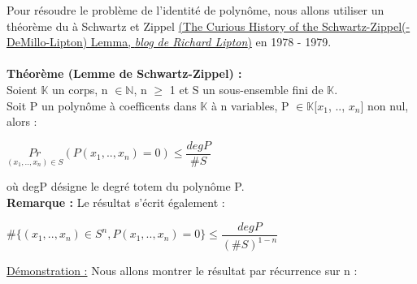 \documentclass[12pt,a4paper]{article}
\begin{document}
Pour résoudre le problème de l'identité de polynôme, nous allons utiliser un théorème du à Schwartz et Zippel \href{https://rjlipton.wordpress.com/2009/11/30/the-curious-history-of-the-schwartz-zippel-lemma/}{(The Curious History of the Schwartz-Zippel(-DeMillo-Lipton) Lemma, \textit{blog de Richard Lipton})} en 1978 - 1979.\\\\
\textbf{\large Théorème (Lemme de Schwartz-Zippel) :}\\
Soient $\mathbb{K}$ un corps, n $\in \mathbb{N}$, n $\geq$ 1 et S un sous-ensemble fini de $\mathbb{K}$.\\
Soit P un polynôme à coefficents dans $\mathbb{K}$ à n variables, P $\in \mathbb{K}$[$x_1$, .., $x_n$] non nul, alors :
\begin{center}
	$\underset{(x_1, .., x_n)\in S}{Pr} (P(x_1, .., x_n) = 0) \leq \dfrac{degP}{\#S}$
\end{center}
où degP désigne le degré totem du polynôme P.\\
\textbf{Remarque :} Le résultat s'écrit également :
\begin{center}
	$\#\{(x_1, .., x_n) \in S^n, P(x_1, .., x_n) = 0\} \leq \dfrac{degP}{(\#S)^{1 - n}}$
\end{center}
\underline{Démonstration :} Nous allons montrer le résultat par récurrence sur n :
\end{document}
